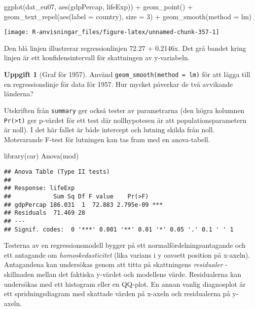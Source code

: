 \documentclass[
]{book}
\newenvironment{Shaded}{\begin{snugshade}}{\end{snugshade}}
\newcommand{\AttributeTok}[1]{\textcolor[rgb]{0.77,0.63,0.00}{#1}}
\newcommand{\DecValTok}[1]{\textcolor[rgb]{0.00,0.00,0.81}{#1}}
\newcommand{\FunctionTok}[1]{\textcolor[rgb]{0.00,0.00,0.00}{#1}}
\newcommand{\NormalTok}[1]{#1}
\newcommand{\SpecialCharTok}[1]{\textcolor[rgb]{0.00,0.00,0.00}{#1}}
\theoremstyle{definition}
\theoremstyle{definition}
\theoremstyle{definition}
\newtheorem{exercise}{Uppgift}[chapter]
\theoremstyle{definition}
\theoremstyle{remark}
\begin{document}
\begin{Shaded}
\begin{Highlighting}[]
\FunctionTok{ggplot}\NormalTok{(dat\_eu07, }\FunctionTok{aes}\NormalTok{(gdpPercap, lifeExp)) }\SpecialCharTok{+}
  \FunctionTok{geom\_point}\NormalTok{() }\SpecialCharTok{+}
  \FunctionTok{geom\_text\_repel}\NormalTok{(}\FunctionTok{aes}\NormalTok{(}\AttributeTok{label =}\NormalTok{ country), }\AttributeTok{size =} \DecValTok{3}\NormalTok{) }\SpecialCharTok{+}
  \FunctionTok{geom\_smooth}\NormalTok{(}\AttributeTok{method =}\NormalTok{ lm)}
\end{Highlighting}
\end{Shaded}

\begin{center}\texttt{[image: R-anvisningar\_files/figure-latex/unnamed-chunk-357-1]} \end{center}

Den blå linjen illustrerar regressionlinjen 72.27 + 0.2146x. Det grå bandet kring linjen är ett konfidensintervall för skattningen av y-variabeln.

\begin{exercise}[Graf för 1957]
Använd \texttt{geom\_smooth(method\ =\ lm)} för att lägga till en regressionslinje för data för 1957. Hur mycket påverkar de två avvikande länderna?
\end{exercise}

Utskriften från \texttt{summary} ger också tester av parametrarna (den högra kolumnen \texttt{Pr(\textgreater{}\textbar{}t\textbar{})} ger p-värdet för ett test där nollhypotesen är att populationsparametern är noll). I det här fallet är både intercept och lutning skilda från noll. Motsvarande F-test för lutningen kan tas fram med en anova-tabell.

\begin{Shaded}
\begin{Highlighting}[]
\FunctionTok{library}\NormalTok{(car)}
\FunctionTok{Anova}\NormalTok{(mod)}
\end{Highlighting}
\end{Shaded}

\begin{verbatim}
## Anova Table (Type II tests)
## 
## Response: lifeExp
##            Sum Sq Df F value    Pr(>F)    
## gdpPercap 186.031  1  72.883 2.795e-09 ***
## Residuals  71.469 28                      
## ---
## Signif. codes:  0 '***' 0.001 '**' 0.01 '*' 0.05 '.' 0.1 ' ' 1
\end{verbatim}

Testerna av en regressionsmodell bygger på ett normalfördelningsantagande och ett antagande om \emph{homoskedasticitet} (lika varians i y oavsett position på x-axeln). Antagandena kan undersökas genom att titta på skattningens \emph{residualer} - skillnaden mellan det faktiska y-värdet och modellens värde. Residualerna kan undersökas med ett histogram eller en QQ-plot. En annan vanlig diagnosplot är ett spridningsdiagram med skattade värden på x-axeln och residualerna på y-axeln.
\end{document}
